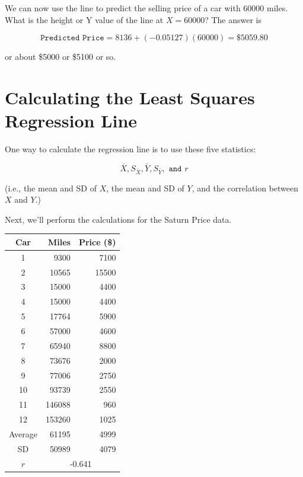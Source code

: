 \documentclass[11pt, chapterprefix=true]{scrbook}\usepackage[]{graphicx}\usepackage[]{color}
\begin{document}
We can now use the line to predict the selling price of a car with 60000 miles.  What is the height or Y value of the line at $X = 60000$?  The answer is

\begin{equation*}
  \texttt{Predicted Price} = 8136 + (-0.05127)(60000) = \$5059.80
\end{equation*}

or about \$5000 or \$5100 or so.

\section{Calculating the Least Squares Regression Line}

One way to calculate the regression line is to use these five statistics:

$$ \bar{X}, S_{\bar{X}}, \bar{Y}, S_{\bar{Y}}, \texttt{ and } r  $$

(i.e., the mean and SD of $X$, the mean and SD of $Y$, and the correlation between $X$ and $Y$.)

\begin{center}
\end{center}

Next, we'll perform the calculations for the Saturn Price data. 

\begin{table}[ht]
\centering 
\begin{tabular}{@{} c rr @{}} \hline 
Car & Miles & Price (\$) \\ \hline
1 & 9300 & 7100 \\
2 & 10565 & 15500 \\
3 & 15000 & 4400 \\
4 & 15000 & 4400 \\
5 & 17764 & 5900 \\
6 & 57000 & 4600 \\
7 & 65940 & 8800 \\
8 & 73676 & 2000 \\
9 & 77006 & 2750 \\
10 & 93739 & 2550 \\
11 & 146088 & 960 \\
12 & 153260 & 1025 \\ \hline
Average & 61195 & 4999 \\
SD  & 50989 & 4079 \\
$r$ & \multicolumn{2}{c}{-0.641} \\ \hline
\end{tabular}
\end{table}
\end{document}
